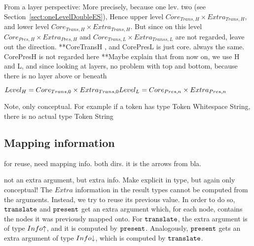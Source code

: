 From a layer perspective: More precisely, because one lev. two (see Section~\ref{sect:oneLevelDoubleES}), Hence upper level $Core_{Trans,H} \times Extra_{Trans,H}$, and lower level  $Core_{Trans,H} \times Extra_{Trans,H}$. But since on this level $Core_{Pres,H} \times Extra_{Pres,H}$ and $Core_{Trans,L} \times Extra_{Transs,L}$ are not regarded, leave out the direction.
**CoreTransH , and CorePresL is just core. always the same. CorePresH is not regarded here
**Maybe explain that from now on, we use H and L, and since looking at layers, no problem with top and bottom, because there is no layer above or beneath
\begin{small}
\begin{math}
Level_{H} = Core_{Trans,0} \times Extra_{Trans,0}\\
Level_{L} = Core_{Pres,n} \times Extra_{Pres,n}\\
\end{math}\end{small}

Note, only conceptual. For example if a token has type Token Whitespace String, there is no actual type Token String

%																
\subsection{Mapping information}

for reuse, need mapping info. both dirs. it is the arrows from bla.

\newcommand{\iup}[0]{\text{\textuparrow}}
\newcommand{\idwn}[0]{\text{\textdownarrow}}


not an extra argument, but extra info. Make explicit in type, but again only conceptual!
The $Extra$ information in the result types cannot be computed from the arguments. Instead, we try to reuse its previous value. In order to do so, ${\tt translate}$ and ${\tt present}$ get an extra argument which, for each node, contains the nodes it was previously mapped onto. For ${\tt translate}$, the extra argument is of type $Info\iup$, and it is computed by ${\tt present}$. Analogously, ${\tt present}$ gets an extra argument of type $Info\idwn$, which is computed by ${\tt translate}$. 

